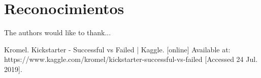 \documentclass[journal]{IEEEtran}
\begin{document}
%

\section*{Reconocimientos}


The authors would like to thank...


\ifCLASSOPTIONcaptionsoff
  \newpage
\fi





%
%
%
\begin{thebibliography}{1}

Kromel. Kickstarter - Successful vs Failed | Kaggle. [online] Available at: https://www.kaggle.com/kromel/kickstarter-successful-vs-failed [Accessed 24 Jul. 2019].

\end{thebibliography}
\end{document}
